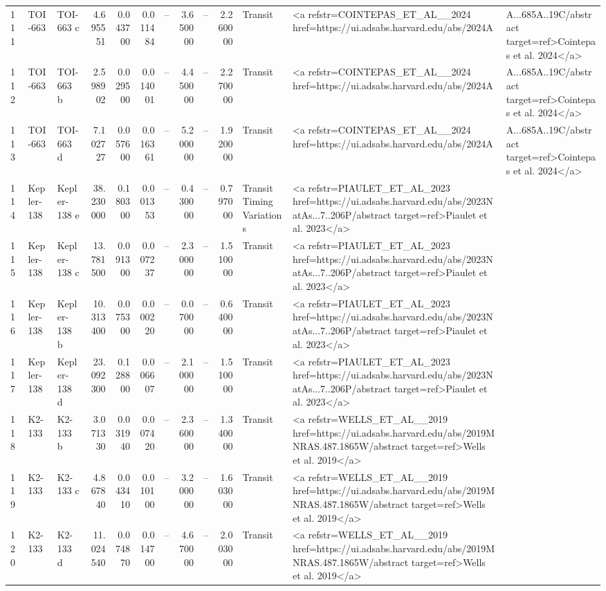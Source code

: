 \begin{tabular}{lllrrrrrrrll}
111 & TOI-663 & TOI-663 c & 4.695551 & 0.043700 & 0.011484 & -- & 3.650000 & -- & 2.260000 & Transit & <a refstr=COINTEPAS_ET_AL__2024 href=https://ui.adsabs.harvard.edu/abs/2024A&A...685A..19C/abstract target=ref>Cointepas et al. 2024</a> \\
112 & TOI-663 & TOI-663 b & 2.598902 & 0.029500 & 0.014001 & -- & 4.450000 & -- & 2.270000 & Transit & <a refstr=COINTEPAS_ET_AL__2024 href=https://ui.adsabs.harvard.edu/abs/2024A&A...685A..19C/abstract target=ref>Cointepas et al. 2024</a> \\
113 & TOI-663 & TOI-663 d & 7.102727 & 0.057600 & 0.016361 & -- & 5.200000 & -- & 1.920000 & Transit & <a refstr=COINTEPAS_ET_AL__2024 href=https://ui.adsabs.harvard.edu/abs/2024A&A...685A..19C/abstract target=ref>Cointepas et al. 2024</a> \\
114 & Kepler-138 & Kepler-138 e & 38.230000 & 0.180300 & 0.001353 & -- & 0.430000 & -- & 0.797000 & Transit Timing Variations & <a refstr=PIAULET_ET_AL_2023 href=https://ui.adsabs.harvard.edu/abs/2023NatAs...7..206P/abstract target=ref>Piaulet et al. 2023</a> \\
115 & Kepler-138 & Kepler-138 c & 13.781500 & 0.091300 & 0.007237 & -- & 2.300000 & -- & 1.510000 & Transit & <a refstr=PIAULET_ET_AL_2023 href=https://ui.adsabs.harvard.edu/abs/2023NatAs...7..206P/abstract target=ref>Piaulet et al. 2023</a> \\
116 & Kepler-138 & Kepler-138 b & 10.313400 & 0.075300 & 0.000220 & -- & 0.070000 & -- & 0.640000 & Transit & <a refstr=PIAULET_ET_AL_2023 href=https://ui.adsabs.harvard.edu/abs/2023NatAs...7..206P/abstract target=ref>Piaulet et al. 2023</a> \\
117 & Kepler-138 & Kepler-138 d & 23.092300 & 0.128800 & 0.006607 & -- & 2.100000 & -- & 1.510000 & Transit & <a refstr=PIAULET_ET_AL_2023 href=https://ui.adsabs.harvard.edu/abs/2023NatAs...7..206P/abstract target=ref>Piaulet et al. 2023</a> \\
118 & K2-133 & K2-133 b & 3.071330 & 0.031940 & 0.007420 & -- & 2.360000 & -- & 1.340000 & Transit & <a refstr=WELLS_ET_AL__2019 href=https://ui.adsabs.harvard.edu/abs/2019MNRAS.487.1865W/abstract target=ref>Wells et al. 2019</a> \\
119 & K2-133 & K2-133 c & 4.867840 & 0.043410 & 0.010100 & -- & 3.200000 & -- & 1.603000 & Transit & <a refstr=WELLS_ET_AL__2019 href=https://ui.adsabs.harvard.edu/abs/2019MNRAS.487.1865W/abstract target=ref>Wells et al. 2019</a> \\
120 & K2-133 & K2-133 d & 11.024540 & 0.074870 & 0.014700 & -- & 4.670000 & -- & 2.003000 & Transit & <a refstr=WELLS_ET_AL__2019 href=https://ui.adsabs.harvard.edu/abs/2019MNRAS.487.1865W/abstract target=ref>Wells et al. 2019</a> \\

\end{tabular}
